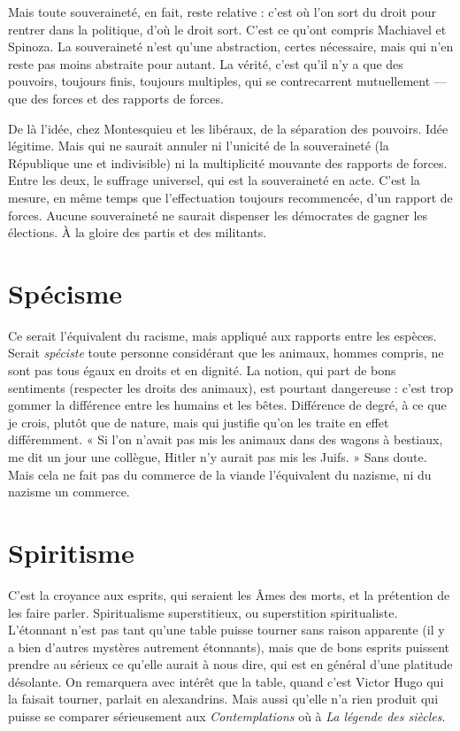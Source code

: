 Mais toute souveraineté, en fait, reste relative : c’est où l’on sort du droit
pour rentrer dans la politique, d’où le droit sort. C'est ce qu'ont compris
Machiavel et Spinoza. La souveraineté n’est qu’une abstraction, certes nécessaire,
mais qui n’en reste pas moins abstraite pour autant. La vérité, c'est qu’il
n’y a que des pouvoirs, toujours finis, toujours multiples, qui se contrecarrent
mutuellement — que des forces et des rapports de forces.

De là l’idée, chez Montesquieu et les libéraux, de la séparation des pouvoirs.
Idée légitime. Mais qui ne saurait annuler ni l’unicité de la souveraineté
(la République une et indivisible) ni la multiplicité mouvante des rapports de
forces. Entre les deux, le suffrage universel, qui est la souveraineté en acte. C’est
la mesure, en même temps que l’effectuation toujours recommencée, d’un rapport
de forces. Aucune souveraineté ne saurait dispenser les démocrates de
gagner les élections. À la gloire des partis et des militants.

\section{Spécisme}
Ce serait l'équivalent du racisme, mais appliqué aux rapports
entre les espèces. Serait {\it spéciste} toute personne considérant que
les animaux, hommes compris, ne sont pas tous égaux en droits et en dignité.
La notion, qui part de bons sentiments (respecter les droits des animaux), est
pourtant dangereuse : c’est trop gommer la différence entre les humains et les
bêtes. Différence de degré, à ce que je crois, plutôt que de nature, mais qui justifie
qu’on les traite en effet différemment. « Si l’on n’avait pas mis les animaux
dans des wagons à bestiaux, me dit un jour une collègue, Hitler n’y aurait pas
mis les Juifs. » Sans doute. Mais cela ne fait pas du commerce de la viande
l'équivalent du nazisme, ni du nazisme un commerce.

\section{Spiritisme}
C'est la croyance aux esprits, qui seraient les Âmes des morts,
et la prétention de les faire parler. Spiritualisme superstitieux,
ou superstition spiritualiste. L’étonnant n’est pas tant qu’une table puisse
tourner sans raison apparente (il y a bien d’autres mystères autrement étonnants),
mais que de bons esprits puissent prendre au sérieux ce qu’elle aurait à
nous dire, qui est en général d’une platitude désolante. On remarquera avec
intérêt que la table, quand c’est Victor Hugo qui la faisait tourner, parlait en
alexandrins. Mais aussi qu’elle n’a rien produit qui puisse se comparer sérieusement
aux {\it Contemplations} où à {\it La légende des siècles}.

